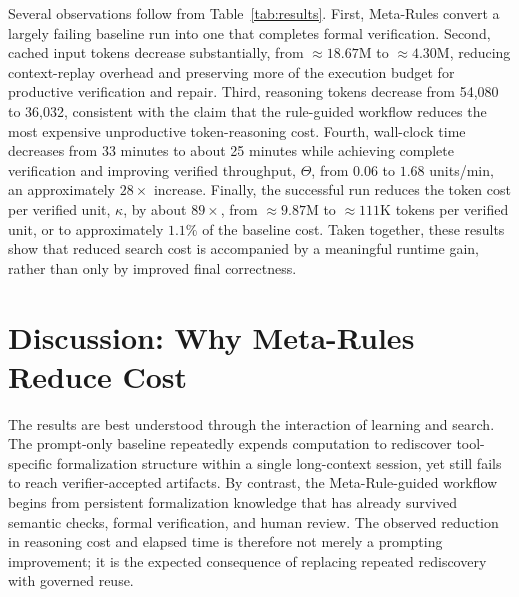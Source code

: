 \documentclass[conference]{IEEEtran}
\begin{document}

Several observations follow from Table~\ref{tab:results}. First, Meta-Rules convert a largely failing baseline run into one that completes formal verification. Second, cached input tokens decrease substantially, from $\approx 18.67$M to $\approx 4.30$M, reducing context-replay overhead and preserving more of the execution budget for productive verification and repair. Third, reasoning tokens decrease from 54,080 to 36,032, consistent with the claim that the rule-guided workflow reduces the most expensive unproductive token-reasoning cost. Fourth, wall-clock time decreases from 33 minutes to about 25 minutes while achieving complete verification and improving verified throughput, $\Theta$, from $0.06$ to $1.68$ units/min, an approximately $28\times$ increase. Finally, the successful run reduces the token cost per verified unit, $\kappa$, by about $89\times$, from $\approx 9.87$M to $\approx 111$K tokens per verified unit, or to approximately $1.1\%$ of the baseline cost. Taken together, these results show that reduced search cost is accompanied by a meaningful runtime gain, rather than only by improved final correctness.
\iffalse
\section{Discussion: Why Meta-Rules Reduce Cost}
\label{sec:discussion}

The results are best understood through the interaction of learning and search. The prompt-only baseline repeatedly expends computation to rediscover tool-specific formalization structure within a single long-context session, yet still fails to reach verifier-accepted artifacts. By contrast, the Meta-Rule-guided workflow begins from persistent formalization knowledge that has already survived semantic checks, formal verification, and human review. The observed reduction in reasoning cost and elapsed time is therefore not merely a prompting improvement; it is the expected consequence of replacing repeated rediscovery with governed reuse.
\end{document}
